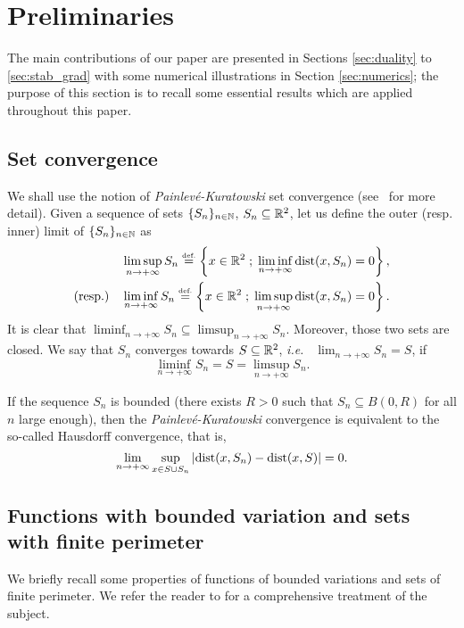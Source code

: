 

\section{Preliminaries}
\label{sec:prelim}
The main contributions of our paper are presented in Sections \ref{sec:duality} to \ref{sec:stab_grad} with some numerical illustrations in Section \ref{sec:numerics}; the purpose of this section is to recall some essential results which are applied throughout this paper.

\subsection{Set convergence}
\label{sec:prelim-setcv}
We shall use the notion of \textit{Painlev\'e-Kuratowski} set convergence (see~\cite{rockafellarwets} for more detail). Given a sequence of sets $\{S_n\}_{n\in\mathbb{N}}$, $S_n\subseteq \mathbb{R}^2$,  let us define the outer (resp. inner) limit of $\{S_n\}_{n\in\mathbb{N}}$ as
\begin{align}
  \limsup_{n\to +\infty} S_n\stackrel{\mbox{\upshape\tiny def.}}{=}\left\{ x\in\mathbb{R}^2 \;;\; \liminf_{n\to +\infty} \mathrm{dist}(x,S_n)=0 \right\}, \\
  \mbox{(resp.)}\quad  \liminf_{n\to +\infty} S_n\stackrel{\mbox{\upshape\tiny def.}}{=}\left\{ x\in\mathbb{R}^2 \;;\; \limsup_{n\to +\infty} \mathrm{dist}(x,S_n)=0 \right\}.
\end{align}
It is clear that $\liminf_{n\to +\infty} S_n\subseteq \limsup_{n\to +\infty} S_n$. Moreover, those two sets are closed. We say that $S_n$ converges towards $S\subseteq \mathbb{R}^2$, \textit{i.e.\ } $\lim_{n\to+\infty} S_n=S$, if
\begin{equation}
  \liminf_{n\to +\infty} S_n =S =\limsup_{n\to +\infty} S_n.
\end{equation}

If the sequence $S_n$ is bounded (there exists $R>0$ such that  $S_n\subseteq B(0,R)$ for all $n$ large enough), then the \textit{Painlev\'e-Kuratowski} convergence is equivalent to the so-called Hausdorff convergence, that is,
\begin{equation}
  \lim_{n\to+\infty} \sup_{x\in S\cup S_n}\left| \mathrm{dist}(x,S_n)-\mathrm{dist}(x,S) \right|=0.
\end{equation}

\subsection{Functions with bounded variation and sets with finite perimeter}
We briefly recall some properties of functions of bounded variations and sets of finite perimeter. We refer the reader to \cite{Ambrosio,maggi2012sets} for a comprehensive treatment of the subject.

